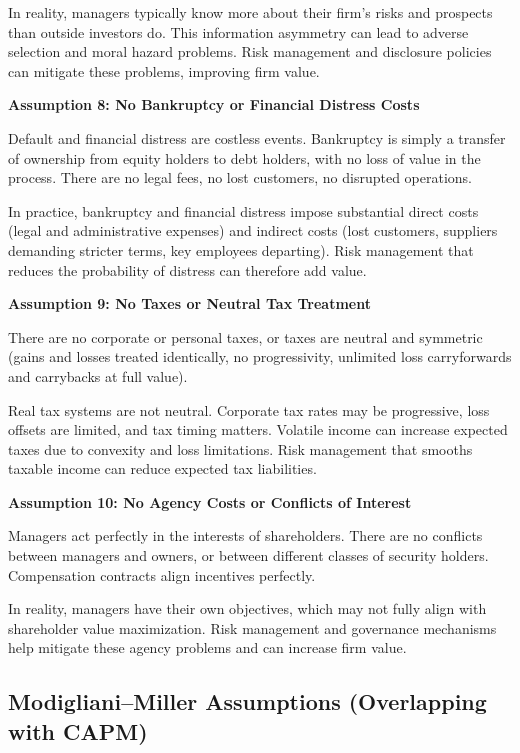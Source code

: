 \documentclass[11pt,openany]{book}
\begin{document}
In reality, managers typically know more about their firm's risks and prospects than outside investors do. This information asymmetry can lead to adverse selection and moral hazard problems. Risk management and disclosure policies can mitigate these problems, improving firm value.

\textbf{Assumption 8: No Bankruptcy or Financial Distress Costs}

Default and financial distress are costless events. Bankruptcy is simply a transfer of ownership from equity holders to debt holders, with no loss of value in the process. There are no legal fees, no lost customers, no disrupted operations.

In practice, bankruptcy and financial distress impose substantial direct costs (legal and administrative expenses) and indirect costs (lost customers, suppliers demanding stricter terms, key employees departing). Risk management that reduces the probability of distress can therefore add value.

\textbf{Assumption 9: No Taxes or Neutral Tax Treatment}

There are no corporate or personal taxes, or taxes are neutral and symmetric (gains and losses treated identically, no progressivity, unlimited loss carryforwards and carrybacks at full value).

Real tax systems are not neutral. Corporate tax rates may be progressive, loss offsets are limited, and tax timing matters. Volatile income can increase expected taxes due to convexity and loss limitations. Risk management that smooths taxable income can reduce expected tax liabilities.

\textbf{Assumption 10: No Agency Costs or Conflicts of Interest}

Managers act perfectly in the interests of shareholders. There are no conflicts between managers and owners, or between different classes of security holders. Compensation contracts align incentives perfectly.

In reality, managers have their own objectives, which may not fully align with shareholder value maximization. Risk management and governance mechanisms help mitigate these agency problems and can increase firm value.

\subsection{Modigliani--Miller Assumptions (Overlapping with CAPM)}\label{modiglianimiller-assumptions-overlapping-with-capm}
\end{document}
